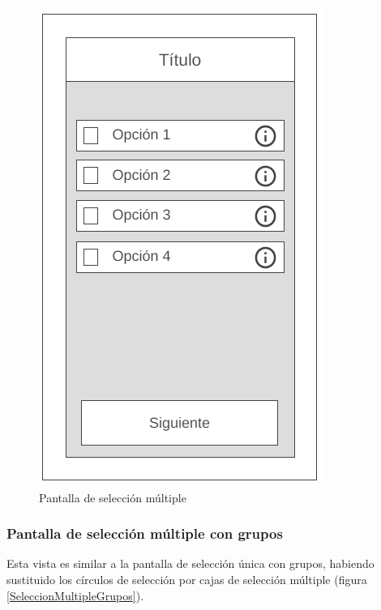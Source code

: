 \begin{figure}[H]
    \centering
    \includegraphics[scale=0.3]{Figures/Mockups/Mock_SeleccionMultiple.png}
    \caption{Pantalla de selección múltiple}
    \label{SeleccionMultiple}    
\end{figure}

\subsubsection{Pantalla de selección múltiple con grupos}
Esta vista es similar a la pantalla de selección única con grupos, habiendo sustituido los círculos de selección por 
cajas de selección múltiple (figura \ref*{SeleccionMultipleGrupos}).

